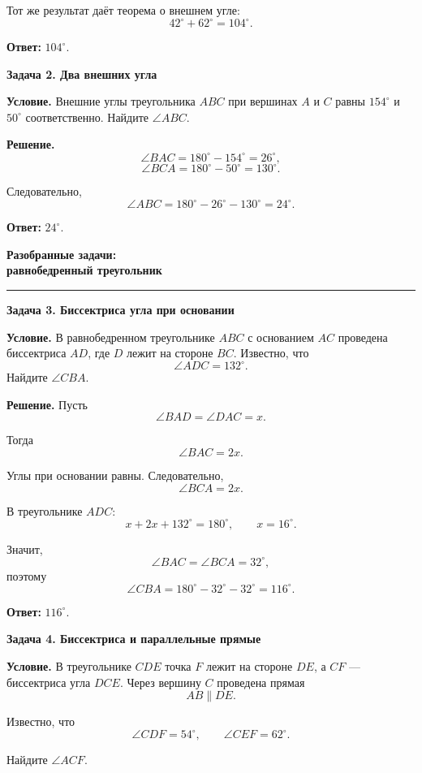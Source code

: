 \documentclass[a4paper,12pt]{article}
\newcommand{\Section}[1]{%
  \Needspace{5\baselineskip}%
  \vspace{0.6em}%
  {\Large\bfseries\color{darkaccent}#1}\par
  \vspace{0.2em}%
  {\color{accent}\rule{0.14\linewidth}{1.2pt}}\par
  \vspace{0.4em}%
}
\newcommand{\Subsection}[1]{%
  \Needspace{3\baselineskip}%
  \vspace{0.45em}%
  {\large\bfseries\color{darkaccent}#1}\par
  \vspace{0.15em}%
}
\newcommand{\Key}[1]{\textbf{\color{darkaccent}#1}}
\newcommand{\degree}{^{\circ}}
\begin{document}
Тот же результат даёт теорема о внешнем угле:
\[
  42\degree+62\degree=104\degree.
\]

\Key{Ответ:} $104\degree$.

\Subsection{Задача 2. Два внешних угла}

\Key{Условие.}
Внешние углы треугольника $ABC$ при вершинах $A$ и $C$
равны $154\degree$ и $50\degree$ соответственно.
Найдите $\angle ABC$.

\Key{Решение.}
\[
  \angle BAC
  =
  180\degree-154\degree
  =
  26\degree,
\]
\[
  \angle BCA
  =
  180\degree-50\degree
  =
  130\degree.
\]

Следовательно,
\[
  \angle ABC
  =
  180\degree-26\degree-130\degree
  =
  24\degree.
\]

\Key{Ответ:} $24\degree$.

\clearpage

\Section{Разобранные задачи:\\равнобедренный треугольник}

\Subsection{Задача 3. Биссектриса угла при основании}

\Key{Условие.}
В равнобедренном треугольнике $ABC$ с основанием $AC$
проведена биссектриса $AD$, где $D$ лежит на стороне $BC$.
Известно, что
\[
  \angle ADC=132\degree.
\]
Найдите $\angle CBA$.

\Key{Решение.}
Пусть
\[
  \angle BAD=\angle DAC=x.
\]

Тогда
\[
  \angle BAC=2x.
\]

Углы при основании равны. Следовательно,
\[
  \angle BCA=2x.
\]

В треугольнике $ADC$:
\[
  x+2x+132\degree=180\degree,
  \qquad
  x=16\degree.
\]

Значит,
\[
  \angle BAC=\angle BCA=32\degree,
\]
поэтому
\[
  \angle CBA
  =
  180\degree-32\degree-32\degree
  =
  116\degree.
\]

\Key{Ответ:} $116\degree$.

\Subsection{Задача 4. Биссектриса и параллельные прямые}

\Key{Условие.}
В треугольнике $CDE$ точка $F$ лежит на стороне $DE$,
а $CF$ — биссектриса угла $DCE$.
Через вершину $C$ проведена прямая
\[
  AB\parallel DE.
\]

Известно, что
\[
  \angle CDF=54\degree,
  \qquad
  \angle CEF=62\degree.
\]

Найдите $\angle ACF$.

\begin{center}
\end{center}
\end{document}
